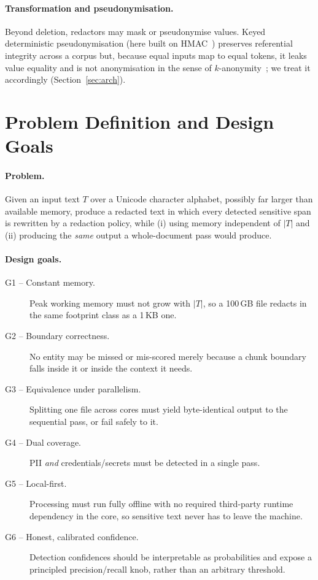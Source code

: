 \documentclass[runningheads]{llncs}
\newcommand{\T}{T}
\begin{document}
\paragraph{Transformation and pseudonymisation.}
Beyond deletion, redactors may mask or pseudonymise values. Keyed deterministic
pseudonymisation (here built on HMAC~\cite{hmac}) preserves referential
integrity across a corpus but, because equal inputs map to equal tokens, it
leaks value equality and is not anonymisation in the sense
of $k$-anonymity~\cite{kanonymity}; we treat it accordingly
(Section~\ref{sec:arch}).

\section{Problem Definition and Design Goals}
\label{sec:problem}

\paragraph{Problem.}
Given an input text $\T$ over a Unicode character alphabet, possibly far larger
than available memory, produce a redacted text in which every detected sensitive
span is rewritten by a redaction policy, while (i) using memory independent of
$|\T|$ and (ii) producing the \emph{same} output a whole-document pass would
produce.

\paragraph{Design goals.}
\begin{description}
\item[G1 -- Constant memory.] Peak working memory must not grow with $|\T|$, so a
100\,GB file redacts in the same footprint class as a 1\,KB one.
\item[G2 -- Boundary correctness.] No entity may be missed or mis-scored merely
because a chunk boundary falls inside it or inside the context it needs.
\item[G3 -- Equivalence under parallelism.] Splitting one file across cores must
yield byte-identical output to the sequential pass, or fail safely to it.
\item[G4 -- Dual coverage.] PII \emph{and} credentials/secrets must be detected
in a single pass.
\item[G5 -- Local-first.] Processing must run fully offline with no required
third-party runtime dependency in the core, so sensitive text never has to leave
the machine.
\item[G6 -- Honest, calibrated confidence.] Detection confidences should be
interpretable as probabilities and expose a principled precision/recall knob,
rather than an arbitrary threshold.
\end{description}
\end{document}
